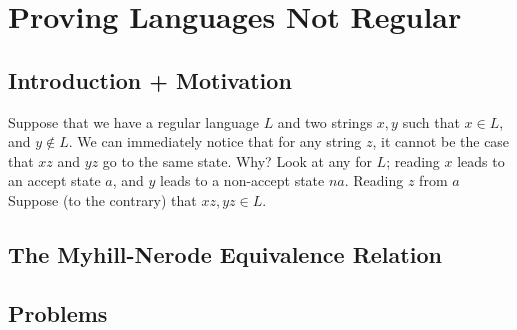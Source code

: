 \chapter{Proving Languages Not Regular}

\section{Introduction + Motivation}

Suppose that we have a regular language $L$ and two strings $x, y$ such that $x \in L$, and $y \notin L$.
We can immediately notice that for any string $z$, it cannot be the case that $xz$ and $yz$ go to the same state.
Why? Look at any \DFA for $L$; reading $x$ leads to an accept state $a$, and $y$ leads to a non-accept state $na$.
Reading $z$ from $a$
Suppose (to the contrary) that $xz, yz \in L$.


\section{The Myhill-Nerode Equivalence Relation}

\section{Problems}